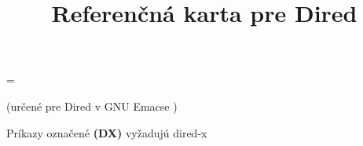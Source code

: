 \def\key#1#2{\leavevmode\hbox to \hsize{\vtop
  {\hsize=.75\hsize\rightskip=1em
  \hskip\keyindent\relax#1}\kbd{#2}\hfil}}

\newbox\metaxbox
\setbox\metaxbox\hbox{}
\newdimen\metaxwidth
\metaxwidth=\wd\metaxbox

\def\metax#1#2{\leavevmode\hbox to \hsize{\hbox to .75\hsize
  {\hskip\keyindent\relax#1\hfil}%
  \hskip -\metaxwidth minus 1fil
  \kbd{#2}\hfil}}

\def\threecol#1#2#3{\hskip\keyindent\relax#1\hfil&\kbd{#2}\hfil\quad
  &\kbd{#3}\hfil\quad\cr}

\def\dx{{\bf (DX)}}

\nopagenumbers



\title{Referenčná karta pre Dired}

\centerline{(určené pre Dired v GNU Emacse \versionemacs)}
\centerline{Príkazy označené \dx{} vyžadujú dired-x}




